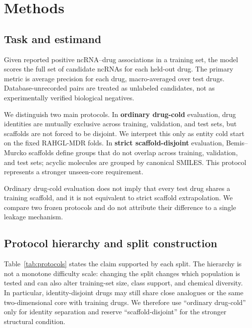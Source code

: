 \documentclass[10pt]{article}
\begin{document}
\section{Methods}

\subsection{Task and estimand}

Given reported positive ncRNA--drug associations in a training set, the model scores the full set of candidate ncRNAs for each held-out drug. The primary metric is average precision for each drug, macro-averaged over test drugs. Database-unrecorded pairs are treated as unlabeled candidates, not as experimentally verified biological negatives.

We distinguish two main protocols. In \textbf{ordinary drug-cold} evaluation, drug identities are mutually exclusive across training, validation, and test sets, but scaffolds are not forced to be disjoint. We interpret this only as entity cold start on the fixed RAHGL-MDR folds. In \textbf{strict scaffold-disjoint} evaluation, Bemis--Murcko scaffolds define groups that do not overlap across training, validation, and test sets; acyclic molecules are grouped by canonical SMILES. This protocol represents a stronger unseen-core requirement.

Ordinary drug-cold evaluation does not imply that every test drug shares a training scaffold, and it is not equivalent to strict scaffold extrapolation. We compare two frozen protocols and do not attribute their difference to a single leakage mechanism.

\subsection{Protocol hierarchy and split construction}

Table~\ref{tab:protocols} states the claim supported by each split. The hierarchy is not a monotone difficulty scale: changing the split changes which population is tested and can also alter training-set size, class support, and chemical diversity. In particular, identity-disjoint drugs may still share close analogues or the same two-dimensional core with training drugs. We therefore use ``ordinary drug-cold'' only for identity separation and reserve ``scaffold-disjoint'' for the stronger structural condition.
\end{document}
